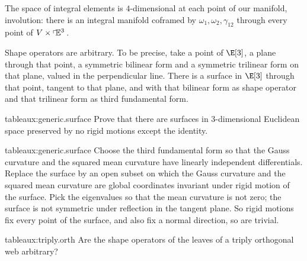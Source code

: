 The space of integral elements is \(4\)-dimensional at each point of our manifold, involution: there is an integral manifold coframed by \(\omega_1,\omega_2,\gamma_{12}\) through every point of \(V \times \left\ulcorner\!\mathbb{E}^{3}\right.\).
\begin{theorem}
Shape operators are arbitrary.
To be precise, take a point of \(\E[3]\), a plane through that point, a symmetric bilinear form and a symmetric trilinear form on that plane, valued in the perpendicular line.
There is a surface in \(\E[3]\) through that point, tangent to that plane, and with that bilinear form as shape operator and that trilinear form as third fundamental form.
\end{theorem}
\begin{problem}{tableaux:generic.surface}
Prove that there are surfaces in \(3\)-dimensional Euclidean space preserved by no rigid motions except the identity.
\end{problem}
\begin{answer}{tableaux:generic.surface}
Choose the third fundamental form so that the Gauss curvature and the squared mean curvature have linearly independent differentials.
Replace the surface by an open subset on which the Gauss curvature and the squared mean curvature are global coordinates invariant under rigid motion of the surface.
Pick the eigenvalues so that the mean curvature is not zero; the surface is not symmetric under reflection in the tangent plane.
So rigid motions fix every point of the surface, and also fix a normal direction, so are trivial.
\end{answer}
\begin{problem}{tableaux:triply.orth}
Are the shape operators of the leaves of a triply orthogonal web arbitrary?
\end{problem}

